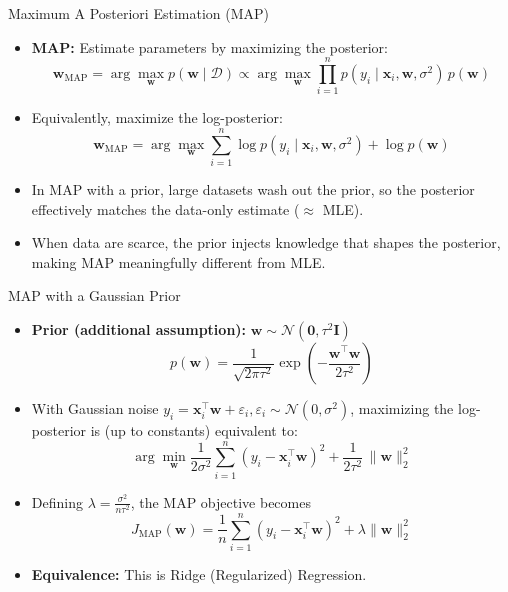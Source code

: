 \documentclass[serif, aspectratio=169]{beamer}
\begin{document}
    \begin{frame}{Maximum A Posteriori Estimation (MAP)}
        \begin{itemize}
            \item \textbf{MAP:} Estimate parameters by maximizing the posterior:
            \[
                \mathbf{w}_{\text{MAP}}
                = \arg\max_{\mathbf{w}}  p(\mathbf{w}\mid \mathcal{D})
                \propto \arg\max_{\mathbf{w}}  \prod_{i=1}^n p(y_i\mid \mathbf{x}_i,\mathbf{w},\sigma^2)\, p(\mathbf{w})
            \]
            \item Equivalently, maximize the log-posterior:
            \[
                \mathbf{w}_{\text{MAP}}
                = \arg\max_{\mathbf{w}}  \sum_{i=1}^n \log p(y_i\mid \mathbf{x}_i,\mathbf{w},\sigma^2) + \log p(\mathbf{w})
            \]
            \item
            In MAP with a prior, large datasets wash out the prior, so the posterior effectively matches the data-only estimate (\(\approx\) MLE).

            \item When data are scarce, the prior injects knowledge that shapes the posterior, making MAP meaningfully different from MLE.
        \end{itemize}
    \end{frame}

    \begin{frame}{MAP with a Gaussian Prior}
        \begin{itemize}
            \item \textbf{Prior (additional assumption):} \(\mathbf{w}\sim \mathcal{N}(\mathbf{0},\tau^2\mathbf{I})\)
            \[
                p(\mathbf{w})=\frac{1}{\sqrt{2\pi\tau^2}}
                \exp\!\left(-\frac{\mathbf{w}^\top \mathbf{w}}{2\tau^2}\right)
            \]
            \item With Gaussian noise \(y_i = \mathbf{x}_i^\top \mathbf{w} + \varepsilon_i, \varepsilon_i\sim\mathcal{N}(0,\sigma^2)\),
            maximizing the log-posterior is (up to constants) equivalent to:
            \[
                \arg\min_{\mathbf{w}}
                \frac{1}{2\sigma^2}\sum_{i=1}^n (y_i-\mathbf{x}_i^\top\mathbf{w})^2
                + \frac{1}{2\tau^2}\,\|\mathbf{w}\|_2^2
            \]
            \item Defining \(\displaystyle \lambda=\frac{\sigma^2}{n\tau^2}\), the MAP objective becomes
            \[
                J_{\text{MAP}}(\mathbf{w})
                = \frac{1}{n}\sum_{i=1}^n (y_i-\mathbf{x}_i^\top\mathbf{w})^2 + \lambda \|\mathbf{w}\|_2^2
            \]
            \item \textbf{Equivalence:} This is Ridge (Regularized) Regression.
        \end{itemize}
    \end{frame}
\end{document}
